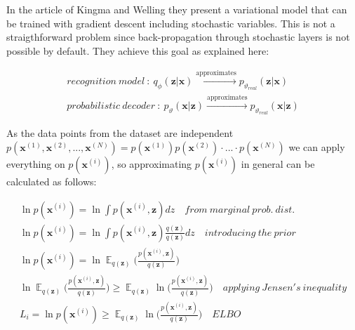 \documentclass[12pt, english]{article}
\DeclareMathOperator*{\E}{\mathbb{E}}
\begin{document}
\vspace{4mm}

\par In the article of Kingma and Welling \cite{kingma2013auto} they present a variational model that can be trained with gradient descent including stochastic variables. This is not a straigthforward problem since back-propagation through stochastic layers is not possible by default. They achieve this goal as explained here:

\vspace{4mm}

\begin{gather*}
    recognition\ model\ :\  q_{\phi}(\bm{z}|\bm{x}) \xrightarrow{\text{approximates}} p_{\vartheta_{real}}(\bm{z} | \bm{x}) \\
    probabilistic\ decoder\ :\ p_{\vartheta}(\bm{x} | \bm{z}) \xrightarrow{\text{approximates}} p_{\vartheta_{real}}(\bm{x} | \bm{z})
\end{gather*}

\vspace{4mm}

\par As the data points from the dataset are independent $p(\bm{x}^{(1)}, \bm{x}^{(2)}, ..., \bm{x}^{(N)}) = p(\bm{x}^{(1)})p(\bm{x}^{(2)})\cdot ... \cdot p(\bm{x}^{(N)})$ we can apply everything on $p(\bm{x}^{(i)})$, so approximating $p(\bm{x}^{(i)})$ in general can be calculated as follows:

\vspace{4mm}

\begin{gather}
    \ln p(\bm{x}^{(i)}) = \ln\int p(\bm{x}^{(i)}, \bm{z})dz \quad from\ marginal\ prob.\ dist.\\
    \ln p(\bm{x}^{(i)}) = \ln\int p(\bm{x}^{(i)}, \bm{z})\frac{q(\bm{z})}{q(\bm{z})}dz \quad introducing\ the\ prior \\
    \ln p(\bm{x}^{(i)}) = \ln \E_{q(\bm{z})} \Big( \frac{p(\bm{x}^{(i)}, \bm{z})}{q(\bm{z})}\Big) \\
    \ln \E_{q(\bm{z})} \Big( \frac{p(\bm{x}^{(i)}, \bm{z})}{q(\bm{z})}\Big) \geq \E_{q(\bm{z})} \ln\Big( \frac{p(\bm{x}^{(i)}, \bm{z})}{q(\bm{z})}\Big) \quad applying\ Jensen's\ inequality \\
    L_{i} = \ln p(\bm{x}^{(i)}) \geq \E_{q(\bm{z})} \ln\Big( \frac{p(\bm{x}^{(i)}, \bm{z})}{q(\bm{z})}\Big) \quad ELBO
\end{gather}

\vspace{4mm}
\end{document}
